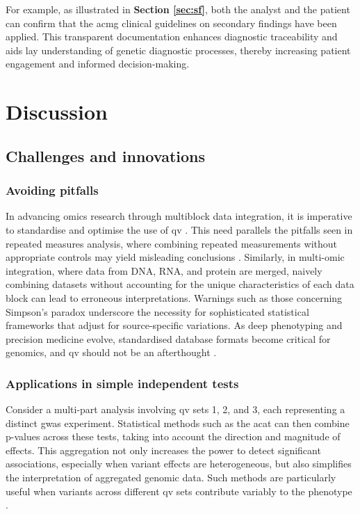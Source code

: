 For example, as illustrated in \textbf{Section \ref{sec:sf}}, both the analyst and the patient can confirm that the \ac{acmg} clinical guidelines on secondary findings have been applied. This transparent documentation enhances diagnostic traceability and aids lay understanding of genetic diagnostic processes, thereby increasing patient engagement and informed decision-making.


\section{Discussion}
\subsection{Challenges and innovations}
\subsubsection{Avoiding pitfalls}

In advancing omics research through multiblock data integration, it is imperative to standardise and optimise the use of \ac{qv} \cite{smilde_multiblock_2022}. This need parallels the pitfalls seen in repeated measures analysis, where combining repeated measurements without appropriate controls may yield misleading conclusions \cite{bland1994correlation}. Similarly, in multi-omic integration, where data from DNA, RNA, and protein are merged, naively combining datasets without accounting for the unique characteristics of each data block can lead to erroneous interpretations. Warnings such as those concerning Simpson's paradox \cite{simpson1951interpretation, wright1934method, pearl2016causal} underscore the necessity for sophisticated statistical frameworks that adjust for source-specific variations. As deep phenotyping and precision medicine evolve, standardised database formats become critical for genomics, and \ac{qv} should not be an afterthought \cite{bycroft2018uk, all2024genomic, ogishima2021dbtmm}.

\subsubsection{Applications in simple independent tests} 

Consider a multi-part analysis involving \ac{qv} sets 1, 2, and 3, each representing a distinct \ac{gwas} experiment. Statistical methods such as the \ac{acat} \cite{liu2019acat, li2020dynamic} can then combine p-values across these tests, taking into account the direction and magnitude of effects. This aggregation not only increases the power to detect significant associations, especially when variant effects are heterogeneous, but also simplifies the interpretation of aggregated genomic data. Such methods are particularly useful when variants across different \ac{qv} sets contribute variably to the phenotype \cite{Lawless2025Archipelago}.

